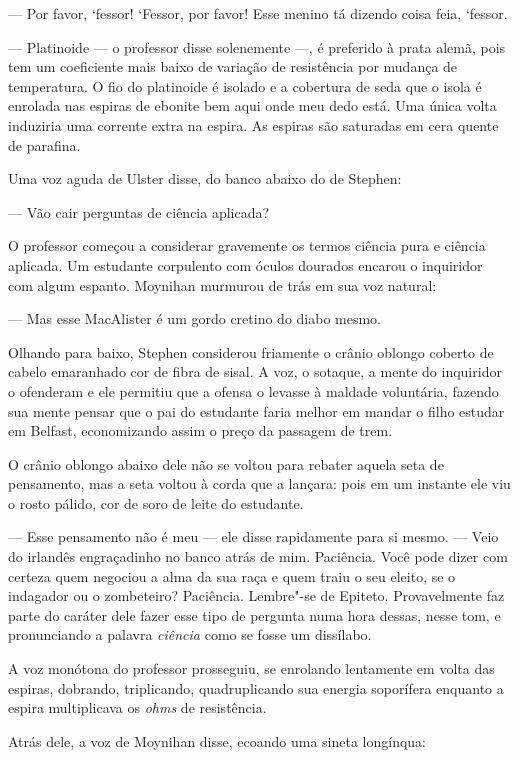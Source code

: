  --- Por favor, ‘fessor! ‘Fessor, por favor! Esse menino tá dizendo coisa
feia, ‘fessor.

 --- Platinoide --- o professor disse solenemente ---, é preferido à prata alemã,
pois tem um coeficiente mais baixo de variação de resistência por
mudança de temperatura. O fio do platinoide é isolado e a cobertura de
seda que o isola é enrolada nas espiras de ebonite bem aqui onde meu
dedo está. Uma única volta induziria uma corrente extra na espira. As
espiras são saturadas em cera quente de parafina.

Uma voz aguda de Ulster disse, do banco abaixo do de Stephen:

 --- Vão cair perguntas de ciência aplicada?

O professor começou a considerar gravemente os termos ciência pura e
ciência aplicada. Um estudante corpulento com óculos dourados encarou o
inquiridor com algum espanto. Moynihan murmurou de trás em sua voz
natural:

 --- Mas esse MacAlister é um gordo cretino do diabo mesmo.

Olhando para baixo, Stephen considerou friamente o crânio oblongo
coberto de cabelo emaranhado cor de fibra de sisal. A voz, o sotaque, a
mente do inquiridor o ofenderam e ele permitiu que a ofensa o levasse à
maldade voluntária, fazendo sua mente pensar que o pai do estudante
faria melhor em mandar o filho estudar em Belfast, economizando assim o
preço da passagem de trem.

O crânio oblongo abaixo dele não se voltou para rebater aquela seta de
pensamento, mas a seta voltou à corda que a lançara: pois em um
instante ele viu o rosto pálido, cor de soro de leite do estudante.

 --- Esse pensamento não é meu --- ele disse rapidamente para si mesmo. --- Veio
do irlandês engraçadinho no banco atrás de mim. Paciência. Você pode
dizer com certeza quem negociou a alma da sua raça e quem traiu o seu
eleito, se o indagador ou o zombeteiro? Paciência. Lembre"-se de
Epiteto. Provavelmente faz parte do caráter dele fazer esse tipo de
pergunta numa hora dessas, nesse tom, e pronunciando a palavra
\textit{ciência} como se fosse um dissílabo.

A voz monótona do professor prosseguiu, se enrolando lentamente em volta
das espiras, dobrando, triplicando, quadruplicando sua energia soporífera 
enquanto a espira multiplicava os \textit{ohms} de resistência.

Atrás dele, a voz de Moynihan disse, ecoando uma sineta longínqua:

